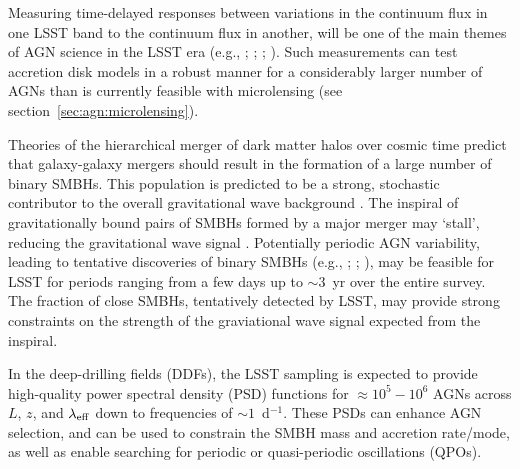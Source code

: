 Measuring time-delayed responses between variations in the continuum flux in one
LSST band to the continuum flux in another, will be one of the main themes of
AGN science in the LSST era (e.g., \citealt{Chelouche2013};
\citealt{CheloucheandZucker2013}; \citealt{EdelsonEtal2015};
\citealt{FausnaughEtal2015}). Such measurements can test accretion disk models
in a robust manner for a considerably larger number of AGNs than is currently
feasible with microlensing (see section~\ref{sec:agn:microlensing}).

Theories of the hierarchical merger of dark matter halos over cosmic time
predict that galaxy-galaxy mergers should result in the formation of a large
number of binary SMBHs. This population is predicted to be a strong, stochastic
contributor to the overall gravitational wave background
\citep{2015arXiv151105564T}. The inspiral of gravitationally bound pairs of
SMBHs formed by a major merger may `stall', reducing the gravitational wave
signal \citep{2014SSRv..183..189C}. Potentially periodic AGN variability,
leading to tentative discoveries of binary SMBHs (e.g.,
\citealt{2015Natur.525..351D}; \citealt{GrahamEtal2015}; \citealt{LiuEtal2015}),
may be feasible for LSST for periods ranging from a few days up to $\sim3$~yr
over the entire survey. The fraction of close SMBHs, tentatively detected by
LSST, may provide strong constraints on the strength of the graviational wave
signal expected from the inspiral.

In the deep-drilling fields (DDFs), the LSST sampling is expected to provide
high-quality power spectral density (PSD) functions for $\approx10^{5} - 10^{6}$
AGNs across $L$, $z$, and $\lambda_{\rm eff}$ down to frequencies of
$\sim1$~d$^{-1}$. These PSDs can enhance AGN selection, and can be used to
constrain the SMBH mass and accretion rate/mode, as well as enable searching for
periodic or quasi-periodic oscillations (QPOs).

%
%


